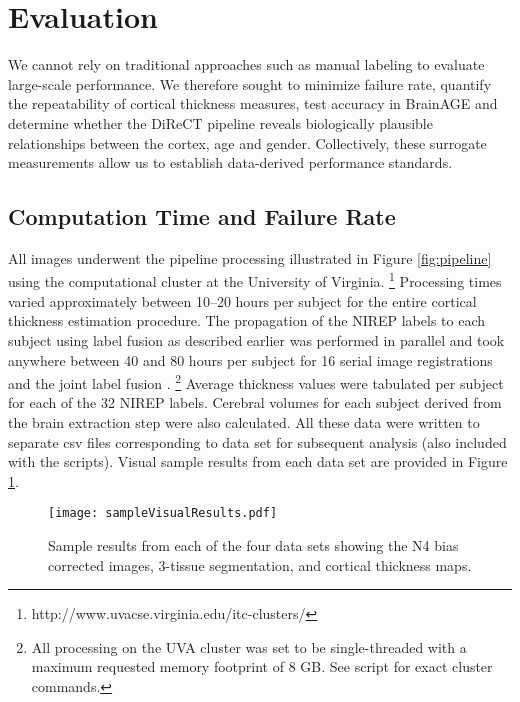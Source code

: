 \section{Evaluation}
We cannot rely on traditional approaches such as manual
labeling to evaluate large-scale performance.  We therefore sought to
minimize failure rate, quantify the repeatability of cortical
thickness measures, test accuracy in BrainAGE \citep{franke2010} and
determine whether the DiReCT pipeline reveals biologically plausible relationships
between the cortex, age and gender.  Collectively, these surrogate
measurements allow us to establish data-derived performance standards.

\subsection{Computation Time and Failure Rate}
All images underwent the pipeline processing illustrated in Figure 
\ref{fig:pipeline} using the computational cluster at the University 
of Virginia.%
\footnote{
http://www.uvacse.virginia.edu/itc-clusters/
}  
Processing times varied approximately between 10--20 hours per subject
for the entire cortical thickness estimation procedure.  The propagation of the
NIREP labels to each subject using label fusion as described earlier
was performed in parallel and took anywhere between 40 and 80 hours per 
subject for 16 serial image registrations and the joint label fusion \citep{wang2013}.%
\footnote{
All processing on the UVA cluster was set to be single-threaded with a maximum requested memory footprint of 8 GB.  See script for exact cluster commands.
}  
Average thickness values were tabulated per subject for each of the
32 NIREP labels.  Cerebral volumes for each subject derived from the brain 
extraction step were also calculated.  All these data were written to separate csv
files corresponding to data set for subsequent 
analysis (also included with the scripts).  Visual sample results from each data set are provided in 
Figure \ref{fig:sampleResults}.

\begin{figure}
  \begin{center}
  \texttt{[image: sampleVisualResults.pdf]}
  \caption{Sample results from each of the four data sets showing the N4 bias
  corrected images, 3-tissue segmentation, and cortical thickness maps.}
  \label{fig:sampleResults}
  \end{center}
\end{figure}

